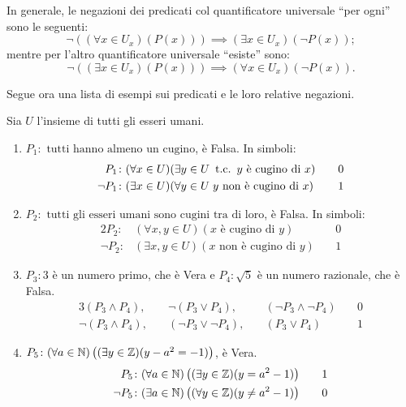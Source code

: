 \noindent In generale, le negazioni dei predicati col quantificatore universale ``per ogni'' sono le seguenti:
\[
    \neg \left((\forall x \in U_x)\left(P(x)\right)\right)
    \implies
    (\exists x \in U_x)\left(\neg P(x)\right);
\]
mentre per l'altro quantificatore universale ``esiste'' sono:
\[
    \neg \left((\exists x \in U_x)\left(P(x)\right)\right)
    \implies
    (\forall x \in U_x)\left(\neg P(x)\right).
\]

Segue ora una lista di esempi sui predicati e le loro relative negazioni.
\begin{examples}
    Sia \(U\) l'insieme di tutti gli esseri umani.
    \begin{enumerate}
        \item \(P_1 \colon \text{ tutti hanno almeno un cugino}\), è Falsa. In simboli:
            \begin{alignat*}{2}
                P_1\colon
                    &(\forall x \in U) (\exists y \in U \mathrm{\hspace*{.5em}t.c.\hspace*{.5em}} y \text{ è cugino di } x)
                        & \quad 0                                                       \\
                \neg P_1\colon
                    &(\exists x \in U) (\forall y \in U \; y \text{ non è cugino di } x)
                        & \quad 1
            \end{alignat*}
%
        \item \(P_2 \colon \text{ tutti gli esseri umani sono cugini tra di loro}\), è Falsa. In simboli:
            \begin{alignat*}{2}
                P_2 \colon
                    &(\forall x,y \in U) (x \text{ è cugino di } y)
                        & \quad 0                                                       \\
                \neg P_2 \colon
                    &(\exists x,y \in U) (x \text{ non è cugino di } y)
                        & \quad 1
            \end{alignat*}
%
        \item \(P_3 \colon 3 \text{ è un numero primo}\), che è Vera e \(P_4 \colon \sqrt{5} \text{ è un numero razionale}\), che è Falsa.
            \begin{alignat*}{3}
                (P_3 \land P_4), \quad &\neg(P_3 \lor P_4), \quad &(\neg P_3 \land \neg P_4) &\quad 0 \\
                \neg(P_3 \land P_4), \quad &(\neg P_3 \lor \neg P_4), \quad &(P_3 \lor P_4)  &\quad 1
            \end{alignat*}
%
        \item \(P_5 \colon (\forall a \in \mathbb{N}) \left((\exists y \in \mathbb{Z}) (y - a^2 = -1)\right)\), è Vera.
            \begin{alignat*}{2}
                P_5 \colon
                    &(\forall a \in \mathbb{N}) \left((\exists y \in \mathbb{Z}) (y = a^2 -1)\right)
                        &\quad 1 \\
                \neg P_5 \colon
                    &(\exists a \in \mathbb{N}) \left((\forall y \in \mathbb{Z}) (y \neq a^2 - 1)\right)
                        &\quad 0
            \end{alignat*}
    \end{enumerate}
\end{examples}

